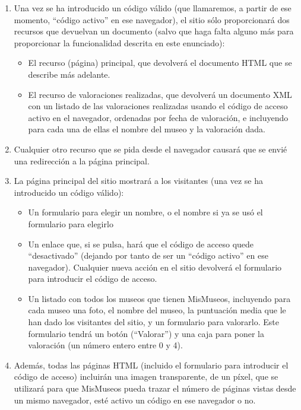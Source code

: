 {\begin{enumerate}
\item Una vez se ha introducido un código válido (que llamaremos, a partir de ese momento, ``código activo'' en ese navegador), el sitio sólo proporcionará dos recursos que devuelvan un documento (salvo que haga falta alguno más para proporcionar la funcionalidad descrita en este enunciado):
  \begin{itemize}
  \item El recurso (página) principal, que devolverá el documento HTML que se describe más adelante.
  \item El recurso de valoraciones realizadas, que devolverá un documento XML con un listado de las valoraciones realizadas usando el código de acceso activo en el navegador, ordenadas por fecha de valoración, e incluyendo para cada una de ellas el nombre del museo y la valoración dada.
  \end{itemize}

\item Cualquier otro recurso que se pida desde el navegador causará que se envié una redirección a la página principal.

\item La página principal del sitio mostrará a los visitantes (una vez se ha introducido un código válido):
  \begin{itemize}
  \item Un formulario para elegir un nombre, o el nombre si ya se usó el formulario para elegirlo
  \item Un enlace que, si se pulsa, hará que el código de acceso quede ``desactivado'' (dejando por tanto de ser un ``código activo'' en ese navegador). Cualquier nueva acción en el sitio devolverá el formulario para introducir el código de acceso.
  \item Un listado con todos los museos que tienen MisMuseos, incluyendo para cada museo una foto, el nombre del museo, la puntuación media que le han dado los visitantes del sitio, y un formulario para valorarlo. Este formulario tendrá un botón (``Valorar'') y una caja para poner la valoración (un número entero entre 0 y 4).
  \end{itemize}

\item Además, todas las páginas HTML (incluido el formulario para introducir el código de acceso) incluirán una imagen transparente, de un píxel, que se utilizará para que MisMuseos pueda trazar el número de páginas vistas desde un mismo navegador, esté activo un código en ese navegador o no.


\end{enumerate}}
